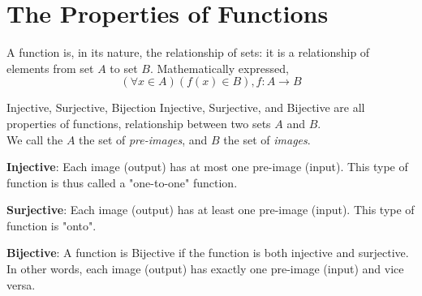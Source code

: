 \section{The Properties of Functions}
A function is, in its nature, the relationship of sets: it is a relationship of elements from set $A$ to set $B$. Mathematically expressed, \\
\[(\forall x \in A) (f(x) \in B), f : A \rightarrow B\]
\begin{ln-define}{Injective, Surjective, Bijection}{}
    Injective, Surjective, and Bijective are all properties of functions, relationship between two sets $A$ and $B$. \\
    We call the $A$ the set of \textit{pre-images}, and $B$ the set of \textit{images}.
    \begin{bindenum}
        \item{
            \textbf{Injective}: Each image (output) has at most one pre-image (input). This type of function is thus called a "one-to-one" function.
            \begin{center}
            \end{center}
        }
        \item{
            \textbf{Surjective}: Each image (output) has at least one pre-image (input). This type of function is "onto".
            \begin{center}
            \end{center}
        }
        \item {
            \textbf{Bijective}: A function is Bijective if the function is both injective and surjective. In other words, each image (output) has exactly one pre-image (input) and vice versa.
        }
    \end{bindenum}
\end{ln-define}